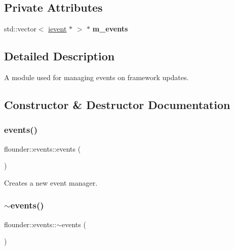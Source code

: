 \subsection*{Private Attributes}
\begin{DoxyCompactItemize}
\item 
\mbox{\label{classflounder_1_1events_ad6bb57d0e1858c5426cf9f466abc7253}} 
std\+::vector$<$ \hyperlink{classflounder_1_1ievent}{ievent} $\ast$ $>$ $\ast$ {\bfseries m\+\_\+events}
\end{DoxyCompactItemize}


\subsection{Detailed Description}
A module used for managing events on framework updates. 



\subsection{Constructor \& Destructor Documentation}
\mbox{\label{classflounder_1_1events_ae354f15876d95e28706b1d96dcd790af}} 
\subsubsection{\texorpdfstring{events()}{events()}}
{\footnotesize\ttfamily flounder\+::events\+::events (\begin{DoxyParamCaption}{ }\end{DoxyParamCaption})}



Creates a new event manager. 

\mbox{\label{classflounder_1_1events_aaf446dc74703b8ce1c04f5cf8cb06eed}} 
\subsubsection{\texorpdfstring{$\sim$events()}{~events()}}
{\footnotesize\ttfamily flounder\+::events\+::$\sim$events (\begin{DoxyParamCaption}{ }\end{DoxyParamCaption})}



